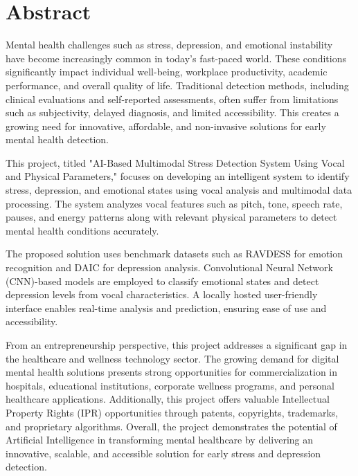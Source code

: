 
\newpage
\chapter*{Abstract}

Mental health challenges such as stress, depression, and emotional instability have become increasingly common in today's fast-paced world. These conditions significantly impact individual well-being, workplace productivity, academic performance, and overall quality of life. Traditional detection methods, including clinical evaluations and self-reported assessments, often suffer from limitations such as subjectivity, delayed diagnosis, and limited accessibility. This creates a growing need for innovative, affordable, and non-invasive solutions for early mental health detection.

This project, titled "AI-Based Multimodal Stress Detection System Using Vocal and Physical Parameters," focuses on developing an intelligent system to identify stress, depression, and emotional states using vocal analysis and multimodal data processing. The system analyzes vocal features such as pitch, tone, speech rate, pauses, and energy patterns along with relevant physical parameters to detect mental health conditions accurately.

The proposed solution uses benchmark datasets such as RAVDESS for emotion recognition and DAIC for depression analysis. Convolutional Neural Network (CNN)-based models are employed to classify emotional states and detect depression levels from vocal characteristics. A locally hosted user-friendly interface enables real-time analysis and prediction, ensuring ease of use and accessibility.

From an entrepreneurship perspective, this project addresses a significant gap in the healthcare and wellness technology sector. The growing demand for digital mental health solutions presents strong opportunities for commercialization in hospitals, educational institutions, corporate wellness programs, and personal healthcare applications. Additionally, this project offers valuable Intellectual Property Rights (IPR) opportunities through patents, copyrights, trademarks, and proprietary algorithms. Overall, the project demonstrates the potential of Artificial Intelligence in transforming mental healthcare by delivering an innovative, scalable, and accessible solution for early stress and depression detection.
